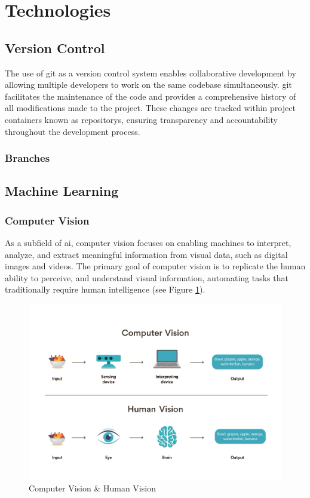\section{Technologies}
\label{sec:technologies}

\subsection{Version Control}
\label{subsec:version-control}

The use of \gls{git} as a version control system enables collaborative development by allowing multiple developers to work on the same codebase simultaneously. \gls{git} facilitates the maintenance of the code and provides a comprehensive history of all modifications made to the project. These changes are tracked within project containers known as \glspl{repository}, ensuring transparency and accountability throughout the development process. \cite{alphaefficiency:git}

\subsubsection*{Branches}

\subsection{Machine Learning}
\label{sec:machine-learning}

\subsubsection*{Computer Vision}
\label{subsubsec:computer-vision}

As a subfield of \gls{ai}, computer vision focuses on enabling machines to interpret, analyze, and extract meaningful information from visual data, such as digital images and videos. The primary goal of computer vision is to replicate the human ability to perceive, and understand visual information, automating tasks that traditionally require human intelligence (see Figure \ref{fig:computer-vision}). \cite{google:vision, microsoft:vision}

\begin{figure}[h!]
    \centering
    \includegraphics[width=0.75\linewidth]{figures/theory/computer-vision.png}
    \caption[Computer Vision \& Human Vision]{Computer Vision \& Human Vision \cite{turing:computer-vision}}
    \label{fig:computer-vision}
\end{figure}

